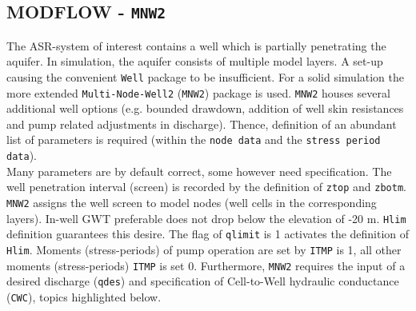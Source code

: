 \subsection{MODFLOW - \texttt{MNW2}}
\label{subsec:MODFLOW_MNW2}
The ASR-system of interest contains a well which is partially penetrating the aquifer. In simulation, the aquifer consists of multiple model layers. A set-up causing the convenient \texttt{Well} package to be insufficient. For a solid simulation the more extended \texttt{Multi-Node-Well2} (\texttt{MNW2}) package is used. \texttt{MNW2} houses several additional well options (e.g. bounded drawdown, addition of well skin resistances and pump related adjustments in discharge). Thence, definition of an abundant list of parameters is required (within the \texttt{node data} and the \texttt{stress period data})\citep{LeonardF.KonikowGeorgeZ.HornbergerKeithJ.Halford2009}.  \\

Many parameters are by default correct, some however need specification. The well penetration interval (screen) is recorded by the definition of \texttt{ztop} and \texttt{zbotm}. \texttt{MNW2} assigns the well screen to model nodes (well cells in the corresponding layers). In-well GWT preferable does not drop below the elevation of -20 m. \texttt{Hlim} definition guarantees this desire. The flag of \texttt{qlimit} is 1 activates the definition of \texttt{Hlim}. Moments (stress-periods) of pump operation are set by \texttt{ITMP} is 1, all other moments (stress-periods) \texttt{ITMP} is set 0. Furthermore, \texttt{MNW2} requires the input of a desired discharge (\texttt{qdes}) and specification of Cell-to-Well hydraulic conductance (\texttt{CWC}), topics highlighted below. \\

